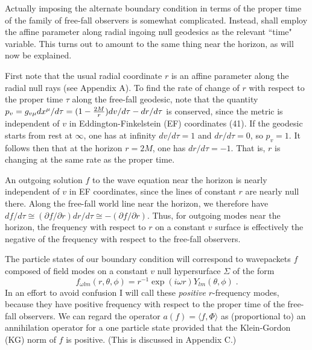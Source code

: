 \documentclass[12pt]{article}
\def\o{\omega}
\def\la{\langle}
\def\ra{\rangle}
\begin{document}
Actually imposing the alternate boundary condition in terms
of the proper time of the family of free-fall observers is
somewhat complicated. Instead, shall employ the affine parameter
along radial ingoing null geodesics as the relevant ``time"
variable. This turns out to amount to the same thing near the
horizon, as will now be explained.

First note that the usual radial coordinate $r$
is an affine parameter along the radial null rays (see
Appendix A). To find the rate of change of $r$ with respect to
the proper time $\tau$ along the free-fall geodesic, note
that the quantity
$p_v=g_{v\mu}dx^\mu/d\tau=(1-{2M\over r})dv/d\tau - dr/d\tau$
is conserved, since the metric is independent of
$v$ in Eddington-Finkelstein (EF) coordinates (41).
If the geodesic starts from rest at $\infty$,
one has at infinity $dv/d\tau=1$ and $dr/d\tau=0$, so $p_v=1$.
It follows then that at the horizon $r=2M$, one has
$dr/d\tau=-1$. That is, $r$ is changing at the same rate
as the proper time.

An outgoing solution $f$ to the wave equation near the
horizon is nearly independent of $v$ in EF coordinates, since
the lines of constant $r$ are nearly null there. Along the
free-fall world line near the horizon, we therefore have
$df/d\tau\cong(\partial f/\partial r) dr/d\tau
\cong-(\partial f/\partial r)$.
Thus, for outgoing modes near the horizon,
the frequency with respect to $r$ on a constant $v$ surface
is effectively the negative of the frequency with respect to
the free-fall observers.

The particle states of our boundary condition will
correspond to wavepackets $f$ composed of field modes
on a constant $v$ null hypersurface $\Sigma$ of the form
\begin{equation}
f_{\o lm}(r,\theta,\phi)=r^{-1}\exp(i\o
r)Y_{lm}(\theta,\phi)\; .
\label{4.1}
\end{equation}
In an effort to avoid confusion I will call these {\it positive}
$r$-frequency modes, because they have positive frequency with
respect to the proper time of the free-fall
observers. We can regard the operator $a(f)=\la f,\Phi\ra$
as (proportional to) an annihilation operator for a one
particle state provided that the Klein-Gordon (KG) norm of $f$ is
positive. (This is discussed in Appendix C.)
\end{document}
